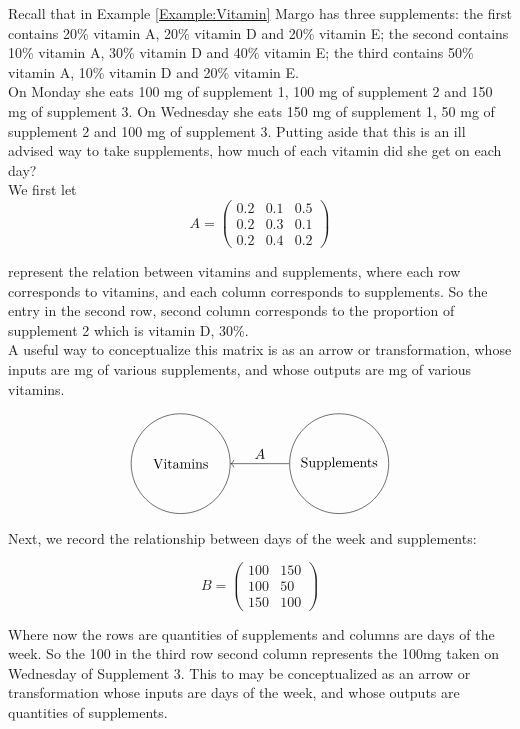 \begin{example}\label{Example:VitProd}

Recall that in Example \ref{Example:Vitamin} Margo has three supplements: the first contains 20\% vitamin A, 20\% vitamin D and 20\%
vitamin E; the second contains 10\% vitamin A, 30\% vitamin D and 40\% vitamin E; the third contains 50\% vitamin A, 10\% vitamin D and 20\% vitamin E.\\

On Monday she eats 100 mg of supplement 1, 100 mg of supplement 2 and 150 mg of supplement 3.  On Wednesday she eats 150 mg of supplement 1, 50 mg of supplement 2 and 100 mg of supplement 3.  Putting aside that this is an ill advised way to take supplements, how much of each vitamin did she get on each day?\\

We first let $$A= \left( \begin{array}{rrr}
0.2 & 0.1 & 0.5\\
0.2 & 0.3 & 0.1\\
0.2 & 0.4 & 0.2
\end{array}\right)$$

represent the relation between vitamins and supplements, where each row corresponds to vitamins, and each column corresponds to supplements.  So the entry in the second row, second column corresponds to the proportion of supplement 2 which is vitamin D, 30\%.\\

A useful way to conceptualize this matrix is as an arrow or transformation, whose inputs are mg of various supplements, and whose outputs are mg of various vitamins.

$$\begin{tikzpicture}
\node(S)[draw,circle,minimum size=2.5cm,inner sep=1pt] at (4,0) {Supplements};
\node(V)[draw,circle,minimum size=2.5cm,inner sep=1pt] at (0,0) {Vitamins};

\draw[->] (S) --node[above]{$A$} (V);

\end{tikzpicture}$$


Next, we record the relationship between days of the week and supplements:

$$B= \left( \begin{array}{rrr}
100 & 150\\
100 & 50\\
150 & 100
\end{array}\right)$$


Where now the rows are quantities of supplements and columns are days of the week.  So the 100 in the third row second column represents the 100mg taken on Wednesday of Supplement 3.  This to may be conceptualized as an arrow or transformation whose inputs are days of the week, and whose outputs are quantities of supplements.


\end{example}
